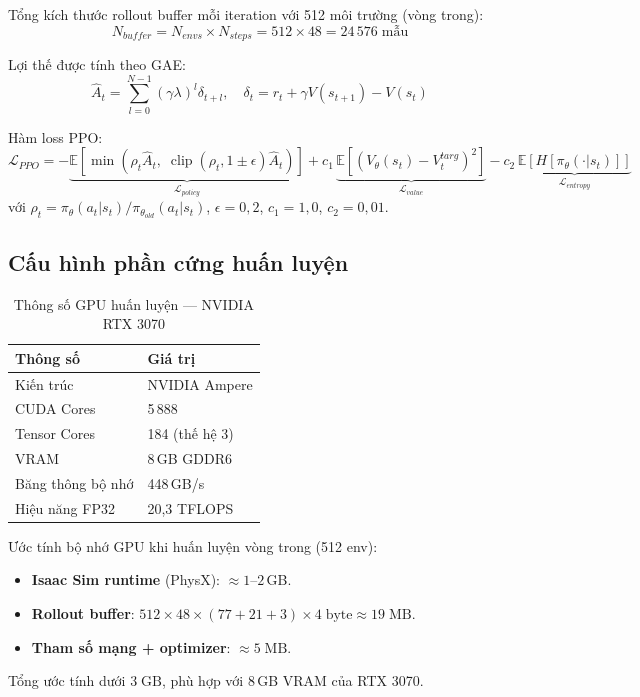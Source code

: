 Tổng kích thước rollout buffer mỗi iteration với 512 môi trường (vòng trong):
\begin{equation}
    N_{buffer} = N_{envs} \times N_{steps} = 512 \times 48 = 24\,576\;\text{mẫu}
    \label{eq:buffer_size}
\end{equation}

Lợi thế được tính theo GAE:
\begin{equation}
    \hat{A}_t = \sum_{l=0}^{N-1} (\gamma\lambda)^l \delta_{t+l},
    \quad \delta_t = r_t + \gamma V(s_{t+1}) - V(s_t)
    \label{eq:gae}
\end{equation}

Hàm loss PPO:
\begin{equation}
    \mathcal{L}_{PPO} =
    -\underbrace{\mathbb{E}\!\left[\min\!\left(
        \rho_t \hat{A}_t,\;
        \operatorname{clip}(\rho_t, 1{\pm}\epsilon)\hat{A}_t
    \right)\right]}_{\mathcal{L}_{policy}}
    + c_1\,\underbrace{\mathbb{E}\!\left[(V_\theta(s_t) - V_t^{targ})^2\right]}_{\mathcal{L}_{value}}
    - c_2\,\underbrace{\mathbb{E}\!\left[H[\pi_\theta(\cdot|s_t)]\right]}_{\mathcal{L}_{entropy}}
    \label{eq:ppo_loss}
\end{equation}
với $\rho_t = \pi_\theta(a_t|s_t)/\pi_{\theta_{old}}(a_t|s_t)$,
$\epsilon = 0{,}2$, $c_1 = 1{,}0$, $c_2 = 0{,}01$.


\subsection{Cấu hình phần cứng huấn luyện}

\begin{table}[H]
    \centering
    \caption{Thông số GPU huấn luyện --- NVIDIA RTX 3070}
    \label{tab:gpu_spec}
    \renewcommand{\arraystretch}{1.3}
    \begin{tabular}{|l|l|}
    \hline
    \textbf{Thông số} & \textbf{Giá trị} \\
    \hline
    Kiến trúc         & NVIDIA Ampere \\
    CUDA Cores        & 5\,888 \\
    Tensor Cores      & 184 (thế hệ 3) \\
    VRAM              & 8\,GB GDDR6 \\
    Băng thông bộ nhớ & 448\,GB/s \\
    Hiệu năng FP32    & 20{,}3 TFLOPS \\
    \hline
    \end{tabular}
\end{table}

Ước tính bộ nhớ GPU khi huấn luyện vòng trong (512 env):
\begin{itemize}
    \item \textbf{Isaac Sim runtime} (PhysX): $\approx 1$--$2$\,GB.
    \item \textbf{Rollout buffer}: $512 \times 48 \times (77 + 21 + 3) \times 4\;\text{byte}
          \approx 19\;\text{MB}$.
    \item \textbf{Tham số mạng + optimizer}: $\approx 5\;\text{MB}$.
\end{itemize}
Tổng ước tính dưới $3\;\text{GB}$, phù hợp với 8\,GB VRAM của RTX 3070.
